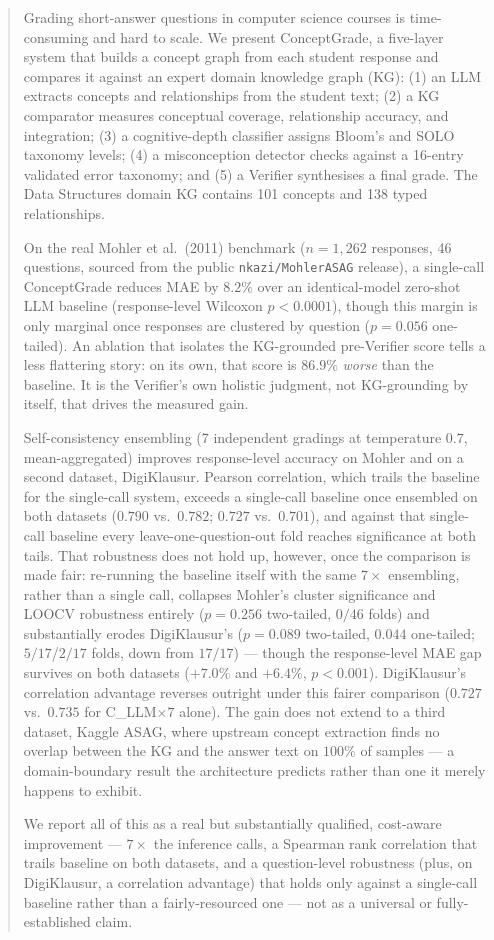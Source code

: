 \documentclass[conference]{IEEEtran}
\begin{document}
\begin{abstract}
Grading short-answer questions in computer science courses is
time-consuming and hard to scale. We present ConceptGrade, a five-layer
system that builds a concept graph from each student response and
compares it against an expert domain knowledge graph (KG): (1) an LLM
extracts concepts and relationships from the student text; (2) a KG
comparator measures conceptual coverage, relationship accuracy, and
integration; (3) a cognitive-depth classifier assigns Bloom's and SOLO
taxonomy levels; (4) a misconception detector checks against a
16-entry validated error taxonomy; and (5) a Verifier synthesises a
final grade. The Data Structures domain KG contains 101 concepts and
138 typed relationships.

On the real Mohler et al.\ (2011) benchmark ($n=1{,}262$ responses, 46
questions, sourced from the public \texttt{nkazi/MohlerASAG} release), a
single-call ConceptGrade reduces MAE by $8.2\%$ over an identical-model
zero-shot LLM baseline (response-level Wilcoxon $p<0.0001$), though this
margin is only marginal once responses are clustered by question
($p=0.056$ one-tailed). An ablation that isolates the KG-grounded
pre-Verifier score tells a less flattering story: on its own, that score
is $86.9\%$ \emph{worse} than the baseline. It is the Verifier's own
holistic judgment, not KG-grounding by itself, that drives the measured
gain.

Self-consistency ensembling (7 independent gradings at temperature
$0.7$, mean-aggregated) improves response-level accuracy on Mohler and
on a second dataset, DigiKlausur. Pearson correlation, which trails the
baseline for the single-call system, exceeds a single-call baseline once
ensembled on both datasets ($0.790$ vs.\ $0.782$; $0.727$ vs.\ $0.701$),
and against that single-call baseline every leave-one-question-out fold
reaches significance at both tails. That robustness does not hold up,
however, once the comparison is made fair: re-running the baseline
itself with the same $7\times$ ensembling, rather than a single call,
collapses Mohler's cluster significance and LOOCV robustness entirely
($p=0.256$ two-tailed, $0/46$ folds) and substantially erodes
DigiKlausur's ($p=0.089$ two-tailed, $0.044$ one-tailed; $5/17$/$2/17$
folds, down from $17/17$) — though the response-level MAE gap survives
on both datasets ($+7.0\%$ and $+6.4\%$, $p<0.001$). DigiKlausur's
correlation advantage reverses outright under this fairer comparison
($0.727$ vs.\ $0.735$ for C\_LLM$\times7$ alone). The gain does not
extend to a third dataset, Kaggle ASAG, where upstream concept
extraction finds no overlap between the KG and the answer text on
$100\%$ of samples — a domain-boundary result the architecture predicts
rather than one it merely happens to exhibit.

We report all of this as a real but substantially qualified, cost-aware
improvement — $7\times$ the inference calls, a Spearman rank
correlation that trails baseline on both datasets, and a question-level
robustness (plus, on DigiKlausur, a correlation advantage) that holds
only against a single-call baseline rather than a fairly-resourced one
— not as a universal or fully-established claim.
\end{abstract}
\end{document}
